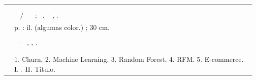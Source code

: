 %
\begin{fichacatalografica}
	\hspace{-1.4cm}
	\imprimirnotaautorizacao \\ \\
	\vspace*{\fill}					%
\begin{center}					%
  \imprimirnotabib \\
  \begin{table}[htb]
	\scriptsize
	\centering	
	\begin{tabular}{|p{0.9cm} p{8.7cm}|}
		\hline
	      & \\
		  &	  \imprimirautorficha     \\
		
		 \imprimircutter & 
							\hspace{0.4cm}\imprimirtitulo~  / ~\imprimirautor~ ;  ~\imprimirorientadorcorpoficha. -- 	\imprimirlocal, \imprimirdata.   \\
		
		  &  %
		
			\hspace{0.4cm}\pageref{LastPage} p. : il. (algumas color.) ; 30 cm.\\ 
		  & \\
		  & 
		    \hspace{0.4cm}\imprimirnotaficha ~--~ 
						  \imprimirunidademin, 
						  \imprimiruniversidademin, 
		                  \imprimirdata. \\ 
		  & \\                 
		  & \\ 
		  & \hspace{0.4cm}1. Churn. 2. Machine Learning. 3. Random Forest. 4. RFM. 5. E-commerce. I. \imprimirorientadorficha. 
		   II. Título. \\
	

\end{tabular}
\end{table}
\end{center}
\end{fichacatalografica}
